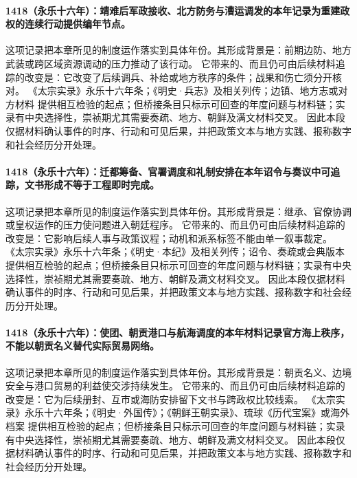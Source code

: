 \paragraph{1418（永乐十六年）：靖难后军政接收、北方防务与漕运调发的本年记录为重建政权的连续行动提供编年节点。} 这项记录把本章所见的制度运作落实到具体年份。其形成背景是：前期边防、地方武装或跨区域资源调动的压力推动了该行动。 它带来的、而且仍可由后续材料追踪的改变是：它改变了后续调兵、补给或地方秩序的条件；战果和伤亡须分开核对。 《太宗实录》永乐十六年条；《明史·兵志》及相关列传；边镇、地方志或对方材料 提供相互检验的起点；但桥接条目只标示可回查的年度问题与材料链；实录有中央选择性，崇祯期尤其需要奏疏、地方、朝鲜及满文材料交叉。 因此本段仅据材料确认事件的时序、行动和可见后果，并把政策文本与地方实践、报称数字和社会经历分开处理。

\paragraph{1418（永乐十六年）：迁都筹备、官署调度和礼制安排在本年诏令与奏议中可追踪，文书形成不等于工程即时完成。} 这项记录把本章所见的制度运作落实到具体年份。其形成背景是：继承、官僚协调或皇权运作的压力使问题进入朝廷程序。 它带来的、而且仍可由后续材料追踪的改变是：它影响后续人事与政策议程；动机和派系标签不能由单一叙事裁定。 《太宗实录》永乐十六年条；《明史·本纪》及相关列传；诏令、奏疏或会典版本 提供相互检验的起点；但桥接条目只标示可回查的年度问题与材料链；实录有中央选择性，崇祯期尤其需要奏疏、地方、朝鲜及满文材料交叉。 因此本段仅据材料确认事件的时序、行动和可见后果，并把政策文本与地方实践、报称数字和社会经历分开处理。

\paragraph{1418（永乐十六年）：使团、朝贡港口与航海调度的本年材料记录官方海上秩序，不能以朝贡名义替代实际贸易网络。} 这项记录把本章所见的制度运作落实到具体年份。其形成背景是：朝贡名义、边境安全与港口贸易的利益使交涉持续发生。 它带来的、而且仍可由后续材料追踪的改变是：它为后续册封、互市或海防安排留下文书与跨政权比较线索。 《太宗实录》永乐十六年条；《明史·外国传》；《朝鲜王朝实录》、琉球《历代宝案》或海外档案 提供相互检验的起点；但桥接条目只标示可回查的年度问题与材料链；实录有中央选择性，崇祯期尤其需要奏疏、地方、朝鲜及满文材料交叉。 因此本段仅据材料确认事件的时序、行动和可见后果，并把政策文本与地方实践、报称数字和社会经历分开处理。

